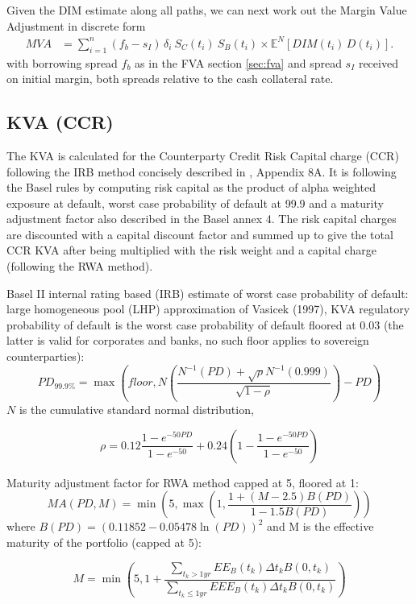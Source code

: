 \documentclass[12pt, a4paper]{article}
\newcommand\E{\ensuremath{\mathbb{E}}}
\newcommand{\MVA}{\mathit{MVA}}
\newcommand{\EE}{\mathit{EE}}
\newcommand{\EEE}{\mathit{EEE}}
\newcommand{\PD}{\mathit{PD}}
\newcommand{\DIM}{\mathit{DIM}}
\newcommand{\MA}{\mathit{MA}}
\begin{document}
{{\begin{appendix}
\medskip
Given the DIM estimate along all paths, we can next work out the Margin Value Adjustment \cite{Lichters} in discrete form
\begin{align}
\MVA &= \sum_{i=1}^n (f_b - s_I)\, \delta_i\: S_C(t_i)\: S_B(t_i) \times \E^N\left[
\DIM(t_i)\,D(t_i)\right]. \label{MVA} 
\end{align}
with borrowing spread $f_b$ as in the FVA section \ref{sec:fva} and spread $s_I$ received on initial margin, both
spreads relative to the cash collateral rate.

\subsection{KVA (CCR)}\label{sec:app_kva}

The KVA is calculated for the Counterparty Credit Risk Capital charge
(CCR) following the IRB method concisely  described in
\cite{Gregory15}, Appendix 8A.
It is following the Basel rules by computing risk capital as the
product of alpha weighted  exposure at default, worst case probability
of default at 99.9  and a maturity adjustment factor also described in
the Basel annex 4.
The risk capital charges are discounted with a capital discount factor
and summed up to  give the total CCR KVA after being multiplied with
the risk  weight and a capital charge (following the RWA method).

\medskip Basel II internal rating based (IRB) estimate of worst case
probability of  default: large homogeneous pool (LHP) approximation of
Vasicek (1997), KVA regulatory probability of default is the worst
case probability of default floored at 0.03 (the latter is valid for 
corporates and banks, no such floor applies to sovereign counterparties):
$$
\PD_{99.9\%} = \max\left(floor, N \left(\frac{N^{-1}(\PD) + \sqrt{\rho}
  N^{-1}(0.999)}{\sqrt{1 - \rho}}\right) - \PD\right)
$$
$N$ is the cumulative standard normal distribution,

$$
\rho = 0.12 \frac{1 - e^{-50 \PD}}{1 - e^{-50}} + 0.24 \left(1 - \frac{1 -
  e^{-50 \PD}}{1 - e^{-50}}\right)
$$

\medskip Maturity adjustment factor for RWA method capped at 5, floored at 1:
$$
\MA(\PD, M) = \min\left(5, \max\left(1, \frac{1 + (M - 2.5) B(\PD)}{1 - 1.5 B(\PD)}\right)\right)
$$
\medskip where $B(\PD) = (0.11852 - 0.05478 \ln(\PD))^2$ and M is the
effective  maturity of the portfolio (capped at 5):

$$M = \min\left(5, 1 + \frac{\sum\limits_{t_k > 1yr} \EE_B(t_k)\Delta t_k
  B(0,t_k)}{\sum\limits_{t_k \leq 1yr} \EEE_B(t_k)\Delta t_k B(0,t_k)}\right)
$$


\end{appendix}}}
\end{document}
